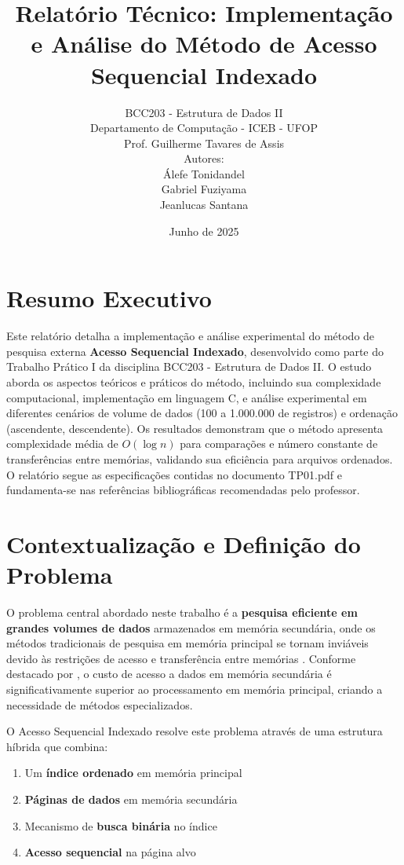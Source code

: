 \documentclass[12pt,a4paper,brazil]{article}
\title{Relatório Técnico: Implementação e Análise do Método de Acesso Sequencial Indexado}
\author{BCC203 - Estrutura de Dados II \\ Departamento de Computação - ICEB - UFOP\\
    Prof. Guilherme Tavares de Assis \\
    \vspace{0.5cm}
    Autores: \\
    Álefe Tonidandel \\
    Gabriel Fuziyama \\
    Jeanlucas Santana}
\date{Junho de 2025}
\begin{document}
\maketitle

\section*{Resumo Executivo}
Este relatório detalha a implementação e análise experimental do método de pesquisa externa \textbf{Acesso Sequencial Indexado}, desenvolvido como parte do Trabalho Prático I da disciplina BCC203 - Estrutura de Dados II. O estudo aborda os aspectos teóricos e práticos do método, incluindo sua complexidade computacional, implementação em linguagem C, e análise experimental em diferentes cenários de volume de dados (100 a 1.000.000 de registros) e ordenação (ascendente, descendente). Os resultados demonstram que o método apresenta complexidade média de \(O(\log n)\) para comparações e número constante de transferências entre memórias, validando sua eficiência para arquivos ordenados. O relatório segue as especificações contidas no documento TP01.pdf e fundamenta-se nas referências bibliográficas recomendadas pelo professor.

\section{Contextualização e Definição do Problema}
O problema central abordado neste trabalho é a \textbf{pesquisa eficiente em grandes volumes de dados} armazenados em memória secundária, onde os métodos tradicionais de pesquisa em memória principal se tornam inviáveis devido às restrições de acesso e transferência entre memórias \cite{cormen2002}. Conforme destacado por \cite{ziviani2010}, o custo de acesso a dados em memória secundária é significativamente superior ao processamento em memória principal, criando a necessidade de métodos especializados.

O Acesso Sequencial Indexado resolve este problema através de uma estrutura híbrida que combina:
\begin{enumerate}
    \item Um \textbf{índice ordenado} em memória principal
    \item \textbf{Páginas de dados} em memória secundária
    \item Mecanismo de \textbf{busca binária} no índice
    \item \textbf{Acesso sequencial} na página alvo
\end{enumerate}
\end{document}
